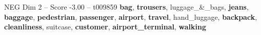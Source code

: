 \begin{textsample}{NEG Dim 2 – Score -3.00 – t009859}  \label{ex:f2_neg_039}
\textbf{bag}, \textbf{trousers}, luggage\_\&\_bags, \textbf{jeans}, \textbf{baggage}, \textbf{pedestrian}, \textbf{passenger}, \textbf{airport}, \textbf{travel}, hand\_luggage, \textbf{backpack}, \textbf{cleanliness}, suitcase, \textbf{customer}, \textbf{airport\_terminal}, \textbf{walking}

\end{textsample}
